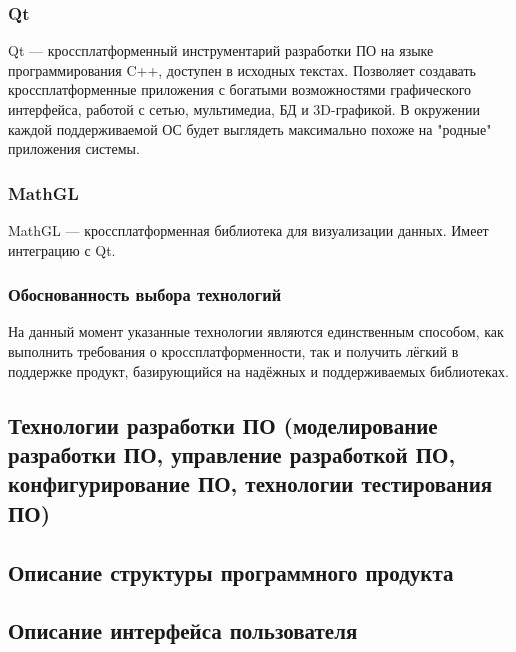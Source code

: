 \subsubsection{Qt}
Qt — кроссплатформенный инструментарий разработки ПО на языке программирования C++, доступен в исходных текстах. Позволяет создавать кроссплатформенные приложения с богатыми возможностями
графического интерфейса, работой с сетью, мультимедиа, БД и 3D-графикой. В окружении каждой поддерживаемой ОС будет выглядеть максимально похоже на "родные" приложения
системы.

\subsubsection{MathGL}
MathGL — кроссплатформенная библиотека для визуализации данных. Имеет интеграцию с Qt.

\subsubsection{Обоснованность выбора технологий}
На данный момент указанные технологии являются единственным способом, как выполнить требования о кроссплатформенности, так и получить лёгкий в поддержке
продукт, базирующийся на надёжных и поддерживаемых библиотеках.

\subsection{Технологии разработки ПО (моделирование разработки ПО, управление разработкой ПО, конфигурирование ПО, технологии тестирования ПО)}
\subsection{Описание структуры программного продукта}


\subsection{Описание интерфейса пользователя}
